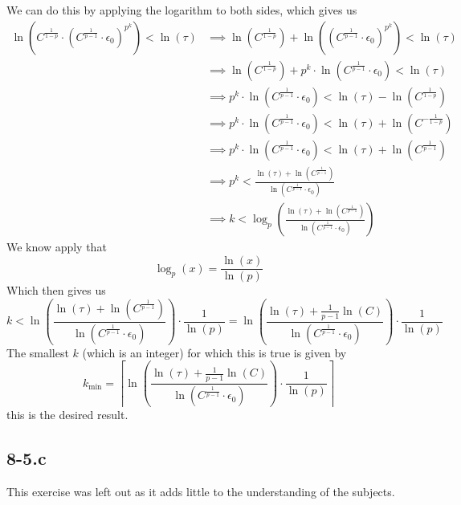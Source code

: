 \documentclass{article}
\begin{document}
\pagebreak

\noindent We can do this by applying the logarithm to both sides, which gives us
\begin{align*}
    \ln\left( C^{\frac{1}{1-p}} \cdot \left(C^{\frac{1}{p-1}}\cdot \epsilon_{0}\right)^{p^{k}}\right) < \ln\left(\tau\right) &\implies \ln\left(C^{\frac{1}{1-p}}\right) + \ln\left(\left(C^{\frac{1}{p-1}}\cdot \epsilon_{0}\right)^{p^{k}}\right) < \ln\left(\tau\right) \\[1mm]
    &\implies \ln\left(C^{\frac{1}{1-p}}\right) + p^{k}\cdot\ln\left(C^{\frac{1}{p-1}}\cdot \epsilon_{0}\right) < \ln\left(\tau\right) \\[1mm]
    &\implies p^{k}\cdot\ln\left(C^{\frac{1}{p-1}}\cdot \epsilon_{0}\right) <\ln\left(\tau\right) - \ln\left(C^{\frac{1}{1-p}}\right) \\
    &\implies p^{k}\cdot\ln\left(C^{\frac{1}{p-1}}\cdot \epsilon_{0}\right) <\ln\left(\tau\right) + \ln\left(C^{-\frac{1}{1-p}}\right) \\
    &\implies p^{k}\cdot\ln\left(C^{\frac{1}{p-1}}\cdot \epsilon_{0}\right) <\ln\left(\tau\right) + \ln\left(C^{\frac{1}{p-1}}\right) \\
    &\implies p^{k}<\frac{\ln\left(\tau\right) + \ln\left(C^{\frac{1}{p-1}}\right)}{\ln\left(C^{\frac{1}{p-1}}\cdot \epsilon_{0}\right)}\\ 
    &\implies k<\log_{p}\left(\frac{\ln\left(\tau\right) + \ln\left(C^{\frac{1}{p-1}}\right)}{\ln\left(C^{\frac{1}{p-1}}\cdot \epsilon_{0}\right)}\right)
\end{align*}
We know apply that
\begin{equation*}
    \log_{p}\left(x\right) = \frac{\ln\left(x\right)}{\ln\left(p\right)}
\end{equation*}
Which then gives us 
\begin{equation*}
k<\ln\left(\frac{\ln\left(\tau\right) + \ln\left(C^{\frac{1}{p-1}}\right)}{\ln\left(C^{\frac{1}{p-1}}\cdot \epsilon_{0}\right)}\right) \cdot \frac{1}{\ln\left(p\right)} =\ln\left(\frac{\ln\left(\tau\right) + \frac{1}{p-1}\ln\left(C\right)}{\ln\left(C^{\frac{1}{p-1}}\cdot \epsilon_{0}\right)}\right) \cdot \frac{1}{\ln\left(p\right)} 
\end{equation*}
The smallest $k$ (which is an integer) for which this is true is given by
\begin{equation*}
    k_{\text{min}} = \left\lceil \ln\left(\frac{\ln\left(\tau\right) + \frac{1}{p-1}\ln\left(C\right)}{\ln\left(C^{\frac{1}{p-1}}\cdot \epsilon_{0}\right)}\right) \cdot \frac{1}{\ln\left(p\right)}\right\rceil
\end{equation*}
this is the desired result.
\subsection*{8-5.c}
This exercise was left out as it adds little to the understanding of the subjects.
\end{document}
